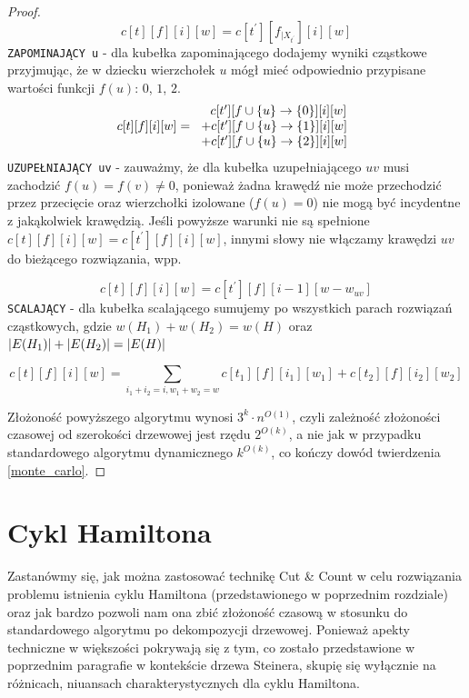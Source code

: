 \documentclass[12pt, oneside]{report}
\newcommand\Omicron{O}
\begin{document}
\begin{proof}
$$c[t][f][i][w] = c[t^{\prime}][f_{\big|X_{t^{\prime}}}][i][w]$$
\newline\newline
\texttt{ZAPOMINAJĄCY u} - dla kubełka zapominającego dodajemy wyniki cząstkowe przyjmując, że w dziecku wierzchołek $u$ mógł mieć odpowiednio przypisane wartości funkcji $f(u)$: $0$, $1$, $2$.
\[
c[t][f][i][w] =  
  \begin{tabular}{ccc}
  $\ \ c[t^{\prime}][f \cup \{u\} \to \{0\}][i][w]$\\
  $+ c[t^{\prime}][f \cup \{u\} \to \{1\}][i][w]$\\
  $+ c[t^{\prime}][f \cup \{u\} \to \{2\}][i][w]$
  \end{tabular}
\]
\newline\newline
\texttt{UZUPEŁNIAJĄCY uv} - zauważmy, że dla kubełka uzupełniającego $uv$ musi zachodzić $f(u) = f(v) \neq 0$, ponieważ żadna krawędź nie może przechodzić przez przecięcie oraz wierzchołki izolowane ($f(u) = 0$) nie mogą być incydentne z jakąkolwiek krawędzią. Jeśli powyższe warunki nie są spełnione $c[t][f][i][w] = c[t^{\prime}][f][i][w]$, innymi słowy nie włączamy krawędzi $uv$ do bieżącego rozwiązania, wpp.

$$c[t][f][i][w] = c[t^{\prime}][f][i-1][w-w_{uv}]$$
\newline\newline
\texttt{SCALAJĄCY} - dla kubełka scalającego sumujemy po wszystkich parach rozwiązań cząstkowych, gdzie $w(H_1) + w(H_2) = w(H)$ oraz $\abs{E(H_1)} + \abs{E(H_2)} = \abs{E(H)}$

$$c[t][f][i][w] = \sum_{i_1 + i_2 = i, w_1 + w_2 = w} c[t_1][f][i_1][w_1] + c[t_2][f][i_2][w_2]$$

Złożoność powyższego algorytmu wynosi $3^k \cdot n^{\Omicron(1)}$, czyli zależność złożoności czasowej od szerokości drzewowej jest rzędu $2^{\Omicron(k)}$, a nie jak w przypadku standardowego algorytmu dynamicznego $k^{\Omicron(k)}$, co kończy dowód twierdzenia \ref{monte_carlo}.
\end{proof}

    	\section{Cykl Hamiltona}

Zastanówmy się, jak można zastosować technikę Cut \& Count w celu rozwiązania problemu istnienia cyklu Hamiltona (przedstawionego w poprzednim rozdziale) oraz jak bardzo pozwoli nam ona zbić złożoność czasową w stosunku do standardowego algorytmu po dekompozycji drzewowej. Ponieważ apekty techniczne w większości pokrywają się z tym, co zostało przedstawione w poprzednim paragrafie w kontekście drzewa Steinera, skupię się wyłącznie na różnicach, niuansach charakterystycznych dla cyklu Hamiltona.
\end{document}
